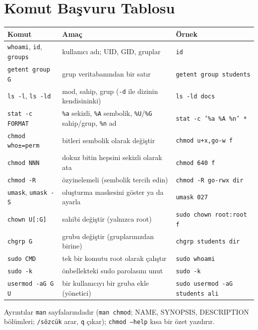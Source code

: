 \documentclass[11pt,a4paper]{article}
\newcommand{\cmd}[1]{\texttt{#1}}
\begin{document}
\section{Komut Başvuru Tablosu}

\begin{center}
\small
\begin{tabularx}{\linewidth}{@{}l X l@{}}
\toprule
\textbf{Komut} & \textbf{Amaç} & \textbf{Örnek} \\
\midrule
\cmd{whoami}, \cmd{id}, \cmd{groups} & kullanıcı adı; UID, GID, gruplar & \cmd{id} \\
\cmd{getent group G} & grup veritabanından bir satır & \cmd{getent group students} \\
\cmd{ls -l}, \cmd{ls -ld} & mod, sahip, grup (\texttt{-d} ile dizinin kendisininki) & \cmd{ls -ld docs} \\
\cmd{stat -c FORMAT} & \texttt{\%a} sekizli, \texttt{\%A} sembolik, \texttt{\%U}/\texttt{\%G} sahip/grup, \texttt{\%n} ad & \cmd{stat -c '\%a \%A \%n' *} \\
\cmd{chmod who±=perm} & bitleri sembolik olarak değiştir & \cmd{chmod u+x,go-w f} \\
\cmd{chmod NNN} & dokuz bitin hepsini sekizli olarak ata & \cmd{chmod 640 f} \\
\cmd{chmod -R} & özyinelemeli (sembolik tercih edin) & \cmd{chmod -R go-rwx dir} \\
\cmd{umask}, \cmd{umask -S} & oluşturma maskesini göster ya da ayarla & \cmd{umask 027} \\
\cmd{chown U[:G]} & sahibi değiştir (yalnızca root) & \cmd{sudo chown root:root f} \\
\cmd{chgrp G} & grubu değiştir (gruplarınızdan birine) & \cmd{chgrp students dir} \\
\cmd{sudo CMD} & tek bir komutu root olarak çalıştır & \cmd{sudo whoami} \\
\cmd{sudo -k} & önbellekteki sudo parolasını unut & \cmd{sudo -k} \\
\cmd{usermod -aG G U} & bir kullanıcıyı bir gruba ekle (yönetici) & \cmd{sudo usermod -aG students ali} \\
\bottomrule
\end{tabularx}
\end{center}

Ayrıntılar \cmd{man} sayfalarındadır (\cmd{man chmod}; NAME, SYNOPSIS, DESCRIPTION bölümleri; \texttt{/sözcük} arar, \texttt{q} çıkar); \cmd{chmod --help} kısa bir özet yazdırır.
\end{document}

